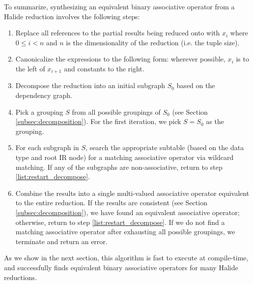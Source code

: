 To summarize, synthesizing an equivalent binary associative operator from a Halide reduction involves the following steps:
\begin{enumerate}
 	\item Replace all references to the partial results being reduced onto with $x_i$ where $0 \le i < n$ and $n$ is the dimensionality of the reduction (i.e. the tuple size).
  \item Canonicalize the expressions to the following form: wherever possible, $x_i$ is to the left of $x_{i+1}$ and constants to the right.
	\item Decompose the reduction into an initial subgraph $S_0$ based on the dependency graph.
	\item Pick a grouping $S$ from all possible groupings of $S_0$ (see Section \ref{subsec:decomposition}). For the first iteration, we pick $S = S_0$ as the grouping. \label{list:restart_decompose}
	\item For each subgraph in $S$, search the appropriate subtable (based on the data type and root IR node) for a matching associative operator via wildcard matching. If any of the subgraphs are non-associative, return to step \ref{list:restart_decompose}.
	\item Combine the results into a single multi-valued associative operator equivalent to the entire reduction. If the results are consistent (see Section \ref{subsec:decomposition}), we have found an equivalent associative operator; otherwise, return to step \ref{list:restart_decompose}. If we do not find a matching associative operator after exhausting all possible groupings, we terminate and return an error. 
\end{enumerate}
As we show in the next section, this algorithm is fast to execute at compile-time, and successfully finds equivalent binary associative operators for many Halide reductions.
